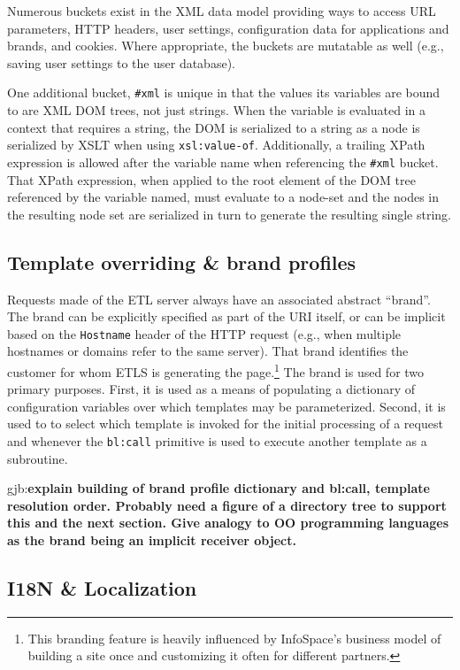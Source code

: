 \documentclass{www2003-submission}
\newcommand{\smtexttt}[1]{{\small\texttt{#1}}}
\newcommand{\gjb}[1]{{\sc gjb:}\textbf{#1}}
\begin{document}
\noindent Numerous buckets exist in the XML data model providing ways
to access URL parameters, HTTP headers, user settings,
configuration data for applications and brands, and cookies.  Where
appropriate, the buckets are mutatable as well (e.g., saving user
settings to the user database).

One additional bucket, \smtexttt{\#xml} is unique in that the values
its variables are bound to are XML DOM trees, not just strings.
When the variable is evaluated in a context that requires a string,
the DOM is serialized to a string as a node is serialized by XSLT when
using
\smtexttt{xsl:value-of}.  Additionally, a trailing XPath expression is
allowed after the variable name when referencing the \smtexttt{\#xml}
bucket.  That XPath expression, when applied to the root element of the
DOM tree referenced by the variable named, must evaluate to a node-set
and the nodes in the resulting node set are serialized in turn to
generate the resulting single string.


\subsection{Template overriding \& brand profiles}
\label{ssec-template-dispatch}

Requests made of the ETL server always have an associated abstract
``brand''.  The brand can be explicitly specified as part of the URI
itself, or can be implicit based on the \smtexttt{Hostname} header of
the HTTP request (e.g., when multiple hostnames or domains refer to
the same server).  That brand identifies the customer for whom ETLS is
generating the page.\footnote{This branding feature is heavily
influenced by InfoSpace's business model of building a site once and
customizing it often for different partners.}  The brand is used for
two primary purposes.  First, it is used as a means of populating a
dictionary of configuration variables over which templates may be
parameterized.  Second, it is used to to select which template is
invoked for the initial processing of a request and whenever the
\smtexttt{bl:call} primitive is used to execute another template as a
subroutine.

\gjb{explain building of brand profile dictionary and
bl:call, template resolution order.  Probably need a figure of a
directory tree to support this and the next section.  Give analogy to
OO programming languages as the brand being an implicit receiver
object.}

\subsection{I18N \& Localization}
\label{ssec-localization}
\end{document}

